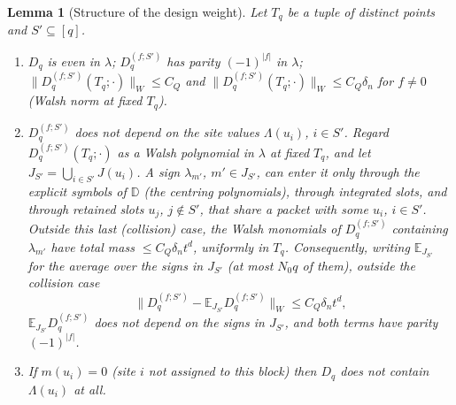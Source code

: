 \documentclass[11pt]{article}
\newtheorem{lemma}[lemma]{Lemma}
\newcommand{\E}{\mathbb{E}}
\newcommand{\norm}[1]{\lVert #1\rVert}
\newcommand{\abs}[1]{\lvert #1\rvert}
\begin{document}
\begin{lemma}[Structure of the design weight]\label{C:lem:weights}
Let \(T_q\) be a tuple of distinct points and \(S'\subseteq[q]\).
\begin{enumerate}[label=(\alph*),leftmargin=*]
\item \(D_q\) is even in \(\lambda\); \(D_q^{(f;S')}\) has parity \((-1)^{\abs f}\)
in \(\lambda\); \(\norm{D_q^{(f;S')}(T_q;\cdot)}_W\le C_Q\) and
\(\norm{D_q^{(f;S')}(T_q;\cdot)}_W\le C_Q\delta_n\) for \(f\ne0\)
(Walsh norm at fixed \(T_q\)).
\item \(D_q^{(f;S')}\) does not depend on the site values \(\Lambda(u_i)\),
\(i\in S'\).  Regard \(D_q^{(f;S')}(T_q;\cdot)\) as a Walsh polynomial in
\(\lambda\) at fixed \(T_q\), and let \(J_{S'}=\bigcup_{i\in S'}J(u_i)\).  A
sign \(\lambda_{m'}\), \(m'\in J_{S'}\), can enter it only through the
explicit symbols of \(\mathbb D\) (the centring polynomials), through
integrated slots, and through retained slots \(u_j\), \(j\notin S'\), that
share a packet with some \(u_i\), \(i\in S'\).  Outside this last
(collision) case, the Walsh monomials of \(D_q^{(f;S')}\) containing
\(\lambda_{m'}\) have total mass \(\le C_Q\delta_nt^d\), uniformly in
\(T_q\).  Consequently, writing \(\E_{J_{S'}}\) for the average over the
signs in \(J_{S'}\) (at most \(N_0q\) of them), outside the collision case
\[
 \bigl\|D_q^{(f;S')}-\E_{J_{S'}}D_q^{(f;S')}\bigr\|_W\le C_Q\delta_nt^d ,
\]
\(\E_{J_{S'}}D_q^{(f;S')}\) does not depend on the signs in \(J_{S'}\), and
both terms have parity \((-1)^{\abs f}\).
\item If \(m(u_i)=0\) (site \(i\) not assigned to this block) then
\(D_q\) does not contain \(\Lambda(u_i)\) at all.
\end{enumerate}
\end{lemma}
\end{document}
